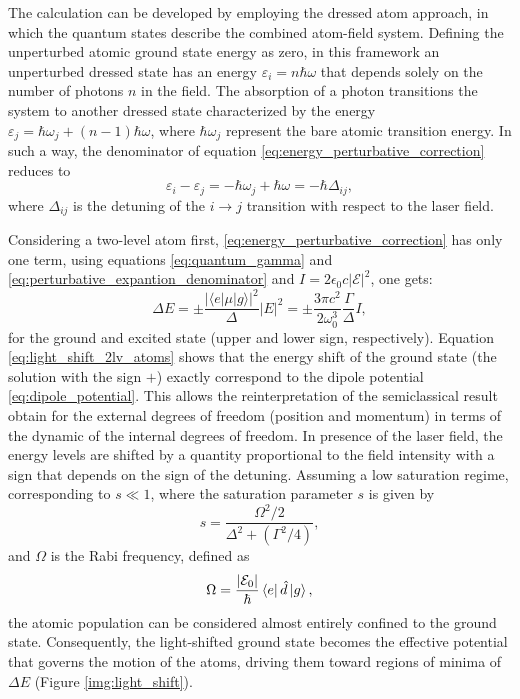 The calculation can be developed by employing the dressed atom approach, in which the quantum states describe the combined atom-field system. Defining the unperturbed atomic ground state energy as zero, in this framework an unperturbed dressed state has an energy $\varepsilon_i=n\hbar\omega$ that depends solely on the number of photons $n$ in the field. The absorption of a photon transitions the system to another dressed state characterized by the energy $\varepsilon_j=\hbar\omega_{j} + (n-1)\hbar\omega$, where $\hbar\omega_{j}$ represent the bare atomic transition energy. In such a way, the denominator of equation \eqref{eq:energy_perturbative_correction} reduces to
\begin{equation}
    \label{eq:perturbative_expantion_denominator}
    \varepsilon_i - \varepsilon_j = -\hbar\omega_j + \hbar\omega = -\hbar\Delta_{ij}, 
\end{equation}
where $\Delta_{ij}$ is the detuning of the $i \rightarrow j$ transition with respect to the laser field.

Considering a two-level atom first, \eqref{eq:energy_perturbative_correction} has only one term, using equations \eqref{eq:quantum_gamma} and \eqref{eq:perturbative_expantion_denominator} and $I=2\epsilon_0c|\mathcal{E}|^2$, one gets:
\begin{equation}
    \label{eq:light_shift_2lv_atoms}
    \Delta E = \pm \frac{|\langle e | \mu | g \rangle|^2}{\Delta} |E|^2 = \pm \frac{3 \pi c^2}{2 \omega_0^3} \frac{\Gamma}{\Delta} I,
\end{equation}
for the ground and excited state (upper and lower sign,
respectively).
Equation \eqref{eq:light_shift_2lv_atoms} shows that the energy shift of the ground state (the solution with the sign $+$) exactly correspond to the dipole potential \eqref{eq:dipole_potential}. This allows the reinterpretation of the semiclassical result obtain for the external degrees of freedom (position and momentum) in terms of the dynamic of the internal degrees of freedom. In presence of the laser field, the energy levels are shifted by a quantity proportional to the field intensity with a sign that depends on the sign of the detuning. Assuming a low saturation regime, corresponding to $s\ll1$, where the saturation parameter $s$ is given by
\begin{equation}
    s = \frac{\Omega^2/2}{\Delta^2 +(\Gamma^2/4)},
\end{equation}
and $\Omega$ is the Rabi frequency, defined as
\begin{equation}
    \Omega = \frac{|\mathcal{E}_0|}{\hbar}\braket{e |\,\hat{d}\,| g},
\end{equation}
the atomic population can be considered almost entirely confined to the ground state. Consequently, the light-shifted ground state becomes the effective potential that governs the motion of the atoms, driving them toward regions of minima of $\Delta E$ (Figure \ref{img:light_shift}). 

